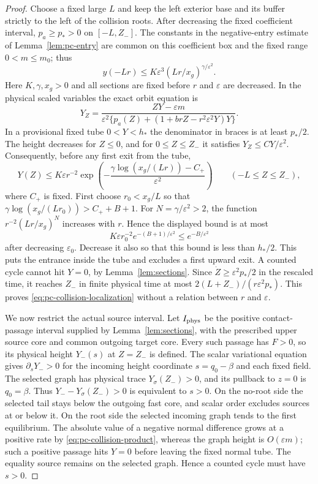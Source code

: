 \begin{proof}
Choose a fixed large $L$ and keep the left exterior base and its buffer
strictly to the left of the collision roots. After decreasing the fixed
coefficient interval, $p_a\ge p_*>0$ on $[-L,Z_-]$. The constants in
the negative-entry estimate of Lemma~\ref{lem:pc-entry} are common on
this coefficient box and the fixed range $0<m\le m_0$; thus
\[
 y(-Lr)\le K\varepsilon^3(Lr/x_g)^{\gamma/\varepsilon^2}.
\]
Here $K,\gamma,x_g>0$ and all sections are fixed before $r$ and
$\varepsilon$ are decreased. In the physical scaled variables the exact
orbit equation is
\[
 Y_Z=\frac{ZY-\varepsilon m}
 {\varepsilon^2\{p_a(Z)+(1+brZ-r^2\varepsilon^2Y)Y\}}.
\]
In a provisional fixed tube $0<Y<h_*$ the denominator in braces is
at least $p_*/2$. The height decreases for $Z\le0$, and for
$0\le Z\le Z_-$ it satisfies $Y_Z\le CY/\varepsilon^2$. Consequently,
before any first exit from the tube,
\[
 Y(Z)\le K\varepsilon r^{-2}
 \exp\left(-\frac{\gamma\log(x_g/(Lr))-C_+}{\varepsilon^2}\right)
 \qquad(-L\le Z\le Z_-),
\]
where $C_+$ is fixed. First choose $r_0<x_g/L$ so that
$\gamma\log(x_g/(Lr_0))>C_++B+1$. For
$N=\gamma/\varepsilon^2>2$, the function
$r^{-2}(Lr/x_g)^N$ increases with $r$. Hence the displayed bound is at
most
\[
 K\varepsilon r_0^{-2}e^{-(B+1)/\varepsilon^2}
 \le e^{-B/\varepsilon^2}
\]
after decreasing $\varepsilon_0$. Decrease it also so that this bound
is less than $h_*/2$. This puts the entrance inside the tube and excludes
a first upward exit. A counted cycle cannot hit $Y=0$, by
Lemma~\ref{lem:sections}. Since $\dot Z\ge\varepsilon^2p_*/2$ in the
rescaled time, it reaches $Z_-$ in finite physical time at most
$2(L+Z_-)/(r\varepsilon^2p_*)$. This proves
\eqref{eq:pc-collision-localization} without a relation between $r$ and
$\varepsilon$.

We now restrict the actual source interval. Let $I_{\rm phys}$ be the
positive contact-passage interval supplied by Lemma~\ref{lem:sections},
with the prescribed upper source core and common outgoing target core.
Every such passage has $F>0$, so its physical height $Y_-(s)$ at
$Z=Z_-$ is defined. The scalar variational equation gives
$\partial_sY_->0$ for the incoming height coordinate $s=q_0-\beta$
and each fixed field. The selected graph has physical trace
$Y_\sigma(Z_-)>0$, and its pullback to $z=0$ is $q_0=\beta$.
Thus $Y_--Y_\sigma(Z_-)>0$ is equivalent to $s>0$. On the no-root
side the selected tail stays below the outgoing fast core, and scalar
order excludes sources at or below it. On the root side the selected
incoming graph tends to the first equilibrium. The absolute value of a
negative normal difference grows at a positive rate by
\eqref{eq:pc-collision-product}, whereas the graph height is
$O(\varepsilon m)$; such a positive passage
hits $Y=0$ before leaving the fixed normal tube. The equality source
remains on the selected graph. Hence a counted cycle must have $s>0$.


\end{proof}

